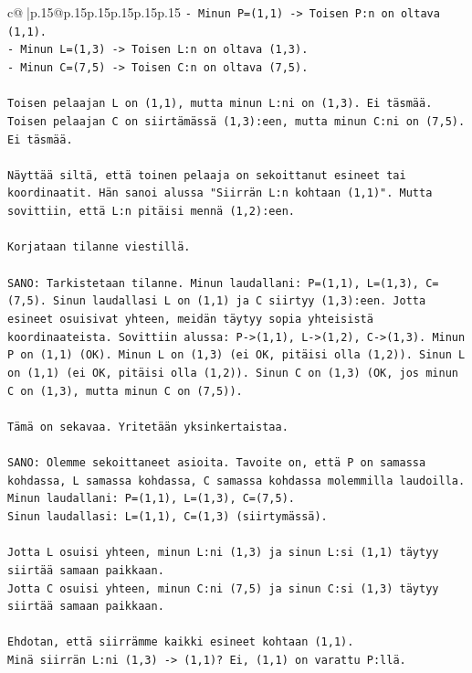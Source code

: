 \documentclass{article}
\begin{document}
{\begin{supertabular}{c@{$\;$}|p{.15\linewidth}@{}p{.15\linewidth}p{.15\linewidth}p{.15\linewidth}p{.15\linewidth}p{.15\linewidth}}
{{{\texttt{{-} Minun P=(1,1) {-}> Toisen P:n on oltava (1,1).} \\
\texttt{{-} Minun L=(1,3) {-}> Toisen L:n on oltava (1,3).} \\
\texttt{{-} Minun C=(7,5) {-}> Toisen C:n on oltava (7,5).} \\
\\ 
\texttt{Toisen pelaajan L on (1,1), mutta minun L:ni on (1,3). Ei täsmää.} \\
\texttt{Toisen pelaajan C on siirtämässä (1,3):een, mutta minun C:ni on (7,5). Ei täsmää.} \\
\\ 
\texttt{Näyttää siltä, että toinen pelaaja on sekoittanut esineet tai koordinaatit. Hän sanoi alussa "Siirrän L:n kohtaan (1,1)". Mutta sovittiin, että L:n pitäisi mennä (1,2):een.} \\
\\ 
\texttt{Korjataan tilanne viestillä.} \\
\\ 
\texttt{SANO: Tarkistetaan tilanne. Minun laudallani: P=(1,1), L=(1,3), C=(7,5). Sinun laudallasi L on (1,1) ja C siirtyy (1,3):een. Jotta esineet osuisivat yhteen, meidän täytyy sopia yhteisistä koordinaateista. Sovittiin alussa: P{-}>(1,1), L{-}>(1,2), C{-}>(1,3). Minun P on (1,1) (OK). Minun L on (1,3) (ei OK, pitäisi olla (1,2)). Sinun L on (1,1) (ei OK, pitäisi olla (1,2)). Sinun C on (1,3) (OK, jos minun C on (1,3), mutta minun C on (7,5)).} \\
\\ 
\texttt{Tämä on sekavaa. Yritetään yksinkertaistaa.} \\
\\ 
\texttt{SANO: Olemme sekoittaneet asioita. Tavoite on, että P on samassa kohdassa, L samassa kohdassa, C samassa kohdassa molemmilla laudoilla.} \\
\texttt{Minun laudallani: P=(1,1), L=(1,3), C=(7,5).} \\
\texttt{Sinun laudallasi: L=(1,1), C=(1,3) (siirtymässä).} \\
\\ 
\texttt{Jotta L osuisi yhteen, minun L:ni (1,3) ja sinun L:si (1,1) täytyy siirtää samaan paikkaan.} \\
\texttt{Jotta C osuisi yhteen, minun C:ni (7,5) ja sinun C:si (1,3) täytyy siirtää samaan paikkaan.} \\
\\ 
\texttt{Ehdotan, että siirrämme kaikki esineet kohtaan (1,1).} \\
\texttt{Minä siirrän L:ni (1,3) {-}> (1,1)? Ei, (1,1) on varattu P:llä.} \\
}}}
\end{supertabular}}
\end{document}
